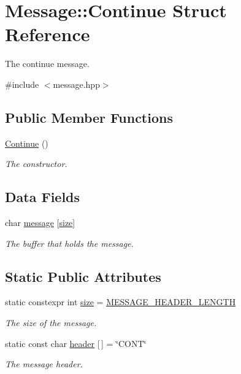 \hypertarget{struct_message_1_1_continue}{}\section{Message\+:\+:Continue Struct Reference}
\label{struct_message_1_1_continue}


The \textquotesingle{}continue\textquotesingle{} message.  




{\ttfamily \#include $<$message.\+hpp$>$}

\subsection*{Public Member Functions}
\begin{DoxyCompactItemize}
\item 
\hyperlink{struct_message_1_1_continue_af54bf191d09a80c339edc705f765ed3d}{Continue} ()
\begin{DoxyCompactList}\small\item\em The constructor. \end{DoxyCompactList}\end{DoxyCompactItemize}
\subsection*{Data Fields}
\begin{DoxyCompactItemize}
\item 
char \hyperlink{struct_message_1_1_continue_a42a1bf71c1b2dbb2022979472a036367}{message} \mbox{[}\hyperlink{struct_message_1_1_continue_a11f9268149d7d619ae87aaf575365919}{size}\mbox{]}
\begin{DoxyCompactList}\small\item\em The buffer that holds the message. \end{DoxyCompactList}\end{DoxyCompactItemize}
\subsection*{Static Public Attributes}
\begin{DoxyCompactItemize}
\item 
static constexpr int \hyperlink{struct_message_1_1_continue_a11f9268149d7d619ae87aaf575365919}{size} = \hyperlink{message_8hpp_ac119f42bacd57152815371e9527d1059}{M\+E\+S\+S\+A\+G\+E\+\_\+\+H\+E\+A\+D\+E\+R\+\_\+\+L\+E\+N\+G\+TH}
\begin{DoxyCompactList}\small\item\em The size of the message. \end{DoxyCompactList}\item 
static const char \hyperlink{struct_message_1_1_continue_a8eed2969a7f8e9948895fd5e94fbb0cb}{header} \mbox{[}$\,$\mbox{]} = \char`\"{}C\+O\+NT\char`\"{}
\begin{DoxyCompactList}\small\item\em The message header. \end{DoxyCompactList}\end{DoxyCompactItemize}


